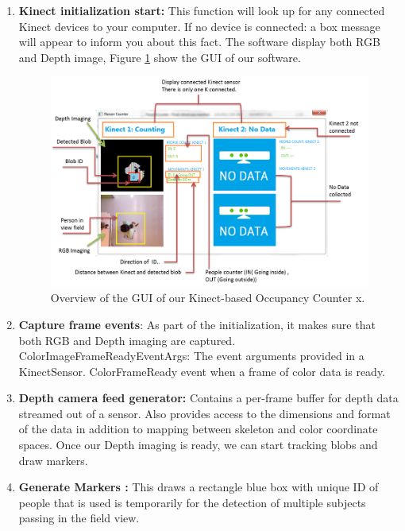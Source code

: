 \documentclass{sig-alternate}
\begin{document}
\begin{enumerate}
  \item \textbf{Kinect initialization start:} This function will look up for any connected Kinect devices to your computer.  If no device is connected: a box message will appear to inform you about this fact.  The software display both RGB and Depth image,  Figure \ref{fig:guioverview} show the GUI of our software.

     \begin{figure}[!ht]
  \begin{center}
	  	\includegraphics[width=1.1\columnwidth]{swm.png}
  \end{center}
  \caption{Overview of the GUI of our Kinect-based Occupancy Counter x.}
  \label{fig:guioverview}
\end{figure}
\item \textbf{Capture frame events}: As part of the initialization,  it makes sure that both RGB and Depth imaging are captured.
ColorImageFrameReadyEventArgs:	The event arguments provided in a KinectSensor. ColorFrameReady event when a frame of color data is ready.
\item \textbf{Depth camera feed generator:} Contains a per-frame buffer for depth data streamed out of a sensor.  Also provides access to the dimensions and format of the data in addition to mapping between skeleton and color coordinate spaces.  Once our Depth imaging is ready, we can start tracking blobs and draw markers.
\item \textbf{Generate Markers :} This draws a rectangle blue box  with unique ID of people that is used is temporarily  for the detection of multiple subjects passing in the field view.

\end{enumerate}
\end{document}
